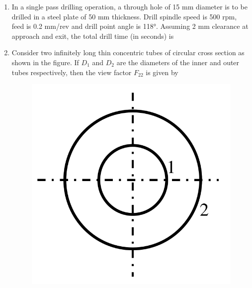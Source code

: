\documentclass[journal,12pt,onecolumn]{IEEEtran}
\begin{document}
\begin{enumerate}[resume]
    \item In a single pass drilling operation, a through hole of 15 mm diameter is to be drilled in a steel plate of 50 mm thickness. Drill spindle speed is 500 rpm, feed is 0.2 mm/rev and drill point angle is 118°. Assuming 2 mm clearance at approach and exit, the total drill time (in seconds) is

          \begin{enumerate}
          \end{enumerate}

    \item Consider two infinitely long thin concentric tubes of circular cross section as shown in the figure. If \(D_1\) and \(D_2\) are the diameters of the inner and outer tubes respectively, then the view factor \(F_{22}\) is given by
          \begin{figure}[H]
              \centering
              \includegraphics[scale=0.2]{q29}
              \caption{}
              \label{q29}
          \end{figure}


\end{enumerate}
\end{document}
